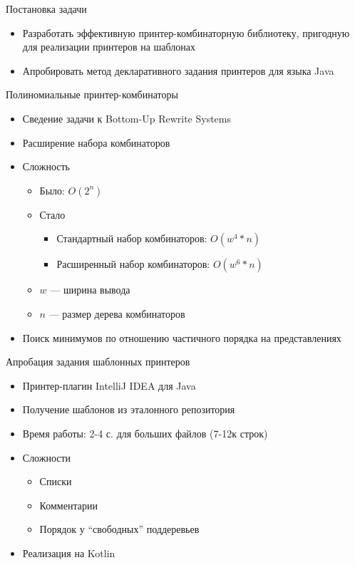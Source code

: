 \documentclass[sans]{beamer}
\begin{document}
\begin{frame}{Постановка задачи}
  \begin{itemize}
    \item Разработать эффективную принтер-комбинаторную библиотеку,
      пригодную для реализации принтеров на шаблонах
    \item Апробировать метод декларативного задания принтеров для языка Java
  \end{itemize}
\end{frame}

\begin{frame}{Полиномиальные принтер-комбинаторы}
  \begin{itemize}
    \item Сведение задачи к Bottom-Up Rewrite Systems
    \item Расширение набора комбинаторов
    \item Сложность
      \begin{itemize}
        \item Было: $O(2^n)$
        \item Стало
          \begin{itemize}
            \item Стандартный набор комбинаторов: $O(w ^ 4 * n)$
            \item Расширенный набор комбинаторов: $O(w ^ 6 * n)$
          \end{itemize}
      \item $w$ --- ширина вывода
      \item $n$ --- размер дерева комбинаторов
      \end{itemize}
    \item Поиск минимумов по отношению частичного порядка на представлениях
  \end{itemize}
\end{frame}

\begin{frame}{Апробация задания шаблонных принтеров}
  \begin{itemize}
    \item Принтер-плагин IntelliJ IDEA для Java
    \item Получение шаблонов из эталонного репозитория
    \item Время работы: 2-4 с. для больших файлов (7-12к строк)
    \item Сложности
      \begin{itemize}
        \item Списки
        \item Комментарии
        \item Порядок у ``свободных'' поддеревьев
      \end{itemize}
    \item Реализация на Kotlin
  \end{itemize}
\end{frame}
\end{document}
